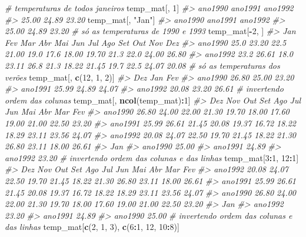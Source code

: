 \documentclass[]{book}
\newenvironment{Shaded}{\begin{snugshade}}{\end{snugshade}}
\newcommand{\KeywordTok}[1]{\textcolor[rgb]{0.13,0.29,0.53}{\textbf{#1}}}
\newcommand{\DecValTok}[1]{\textcolor[rgb]{0.00,0.00,0.81}{#1}}
\newcommand{\StringTok}[1]{\textcolor[rgb]{0.31,0.60,0.02}{#1}}
\newcommand{\CommentTok}[1]{\textcolor[rgb]{0.56,0.35,0.01}{\textit{#1}}}
\newcommand{\OperatorTok}[1]{\textcolor[rgb]{0.81,0.36,0.00}{\textbf{#1}}}
\newcommand{\NormalTok}[1]{#1}
\begin{document}
\begin{Shaded}
\begin{Highlighting}[]
\CommentTok{# temperaturas de todos janeiros}
\NormalTok{temp_mat[, }\DecValTok{1}\NormalTok{]}
\CommentTok{#> ano1990 ano1991 ano1992 }
\CommentTok{#>   25.00   24.89   23.20}
\NormalTok{temp_mat[, }\StringTok{"Jan"}\NormalTok{]}
\CommentTok{#> ano1990 ano1991 ano1992 }
\CommentTok{#>   25.00   24.89   23.20}
\CommentTok{# só as temperaturas de 1990 e 1993}
\NormalTok{temp_mat[}\OperatorTok{-}\DecValTok{2}\NormalTok{, ]}
\CommentTok{#>          Jan   Fev  Mar   Abr  Mai  Jun   Jul   Ago  Set  Out   Nov   Dez}
\CommentTok{#> ano1990 25.0 23.20 22.5 21.00 19.0 17.6 18.00 19.70 21.3 22.0 24.00 26.80}
\CommentTok{#> ano1992 23.2 26.61 18.0 23.11 26.8 21.3 18.22 21.45 19.7 22.5 24.07 20.08}
\CommentTok{# só as temperaturas dos verões}
\NormalTok{temp_mat[, }\KeywordTok{c}\NormalTok{(}\DecValTok{12}\NormalTok{, }\DecValTok{1}\NormalTok{, }\DecValTok{2}\NormalTok{)]}
\CommentTok{#>           Dez   Jan   Fev}
\CommentTok{#> ano1990 26.80 25.00 23.20}
\CommentTok{#> ano1991 25.99 24.89 24.07}
\CommentTok{#> ano1992 20.08 23.20 26.61}
\CommentTok{# invertendo ordem das colunas}
\NormalTok{temp_mat[, }\KeywordTok{ncol}\NormalTok{(temp_mat)}\OperatorTok{:}\DecValTok{1}\NormalTok{]}
\CommentTok{#>           Dez   Nov   Out   Set   Ago   Jul   Jun   Mai   Abr   Mar   Fev}
\CommentTok{#> ano1990 26.80 24.00 22.00 21.30 19.70 18.00 17.60 19.00 21.00 22.50 23.20}
\CommentTok{#> ano1991 25.99 26.61 21.45 20.08 19.37 16.72 18.22 18.29 23.11 23.56 24.07}
\CommentTok{#> ano1992 20.08 24.07 22.50 19.70 21.45 18.22 21.30 26.80 23.11 18.00 26.61}
\CommentTok{#>           Jan}
\CommentTok{#> ano1990 25.00}
\CommentTok{#> ano1991 24.89}
\CommentTok{#> ano1992 23.20}
\CommentTok{# invertendo ordem das colunas e das linhas}
\NormalTok{temp_mat[}\DecValTok{3}\OperatorTok{:}\DecValTok{1}\NormalTok{, }\DecValTok{12}\OperatorTok{:}\DecValTok{1}\NormalTok{]}
\CommentTok{#>           Dez   Nov   Out   Set   Ago   Jul   Jun   Mai   Abr   Mar   Fev}
\CommentTok{#> ano1992 20.08 24.07 22.50 19.70 21.45 18.22 21.30 26.80 23.11 18.00 26.61}
\CommentTok{#> ano1991 25.99 26.61 21.45 20.08 19.37 16.72 18.22 18.29 23.11 23.56 24.07}
\CommentTok{#> ano1990 26.80 24.00 22.00 21.30 19.70 18.00 17.60 19.00 21.00 22.50 23.20}
\CommentTok{#>           Jan}
\CommentTok{#> ano1992 23.20}
\CommentTok{#> ano1991 24.89}
\CommentTok{#> ano1990 25.00}
\CommentTok{# invertendo ordem das colunas e das linhas}
\NormalTok{temp_mat[}\KeywordTok{c}\NormalTok{(}\DecValTok{2}\NormalTok{, }\DecValTok{1}\NormalTok{, }\DecValTok{3}\NormalTok{), }\KeywordTok{c}\NormalTok{(}\DecValTok{6}\OperatorTok{:}\DecValTok{1}\NormalTok{, }\DecValTok{12}\NormalTok{, }\DecValTok{10}\OperatorTok{:}\DecValTok{8}\NormalTok{)]}

\end{Highlighting}
\end{Shaded}
\end{document}

